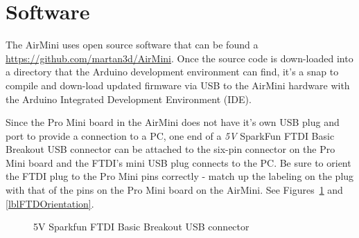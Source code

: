 \documentclass[12pt]{article}
\begin{document}
\section{Software}

The AirMini uses open source software that can be found a \url{https://github.com/martan3d/AirMini}. 
Once the source code is down-loaded into a directory that the Arduino development environment can find, it's a snap to compile and down-load updated firmware via USB to the AirMini hardware with the Arduino Integrated Development Environment (IDE). 

Since the Pro Mini board in the AirMini does not have it's own USB plug and port to provide a connection to a PC, one end of a {\em 5V} SparkFun FTDI Basic Breakout USB connector can be attached to the six-pin connector on the Pro Mini board and the FTDI's mini USB plug connects to the PC.
Be sure to orient the FTDI plug to the Pro Mini pins correctly - match up the labeling on the plug with that of the pins on the Pro Mini board on the AirMini.
See Figures~\ref{lblFTDIUSB} and \ref{lblFTDOrientation}.

\begin{figure}
\centering
{}
\caption{5V Sparkfun FTDI Basic Breakout USB connector}
\label{lblFTDIUSB}
\end{figure}
\end{document}
